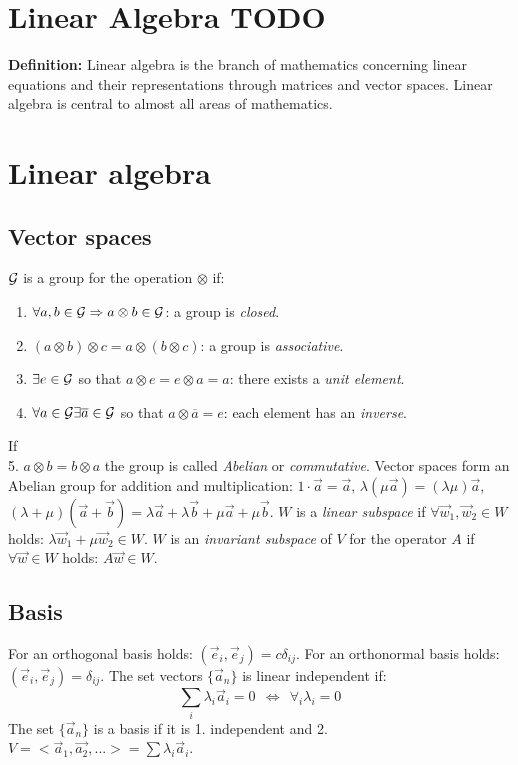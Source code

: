\chapter{Linear Algebra TODO}
\textbf{Definition:} Linear algebra is the branch of mathematics concerning linear equations and their representations through matrices and vector spaces. Linear algebra is central to almost all areas of mathematics.


\chapter{Linear algebra}
\section{Vector spaces}
$\cal G$ is a group for the operation $\otimes$ if:
\begin{enumerate}
	\item $\forall a,b\in{\cal G}\Rightarrow a\otimes b\in\cal G$: a group is
	{\it closed}.
	\item $(a\otimes b)\otimes c = a\otimes (b\otimes c)$: a group is
	{\it associative}.
	\item $\exists e\in{\cal G}$ so that $a\otimes e=e\otimes a=a$: there exists a
	{\it unit element}.
	\item $\forall a\in{\cal G}\exists \overline{a}\in{\cal G}$ so that $a\otimes\overline{a}=e$:
	each element has an {\it inverse}.
\end{enumerate}
If\\
\hspace*{4.5mm}5. $a\otimes b=b\otimes a$
\npar
the group is called {\it Abelian} or {\it commutative}.
Vector spaces form an Abelian group for addition and multiplication:
$1\cdot\vec{a}=\vec{a}$, $\lambda(\mu\vec{a})=(\lambda\mu)\vec{a}$,
$(\lambda+\mu)(\vec{a}+\vec{b})=\lambda\vec{a}+\lambda\vec{b}+\mu\vec{a}+\mu\vec{b}$.
\npar
$W$ is a {\it linear subspace} if $\forall \vec{w}_1,\vec{w}_2\in W$
holds: $\lambda\vec{w}_1+\mu\vec{w}_2\in W$.
\npar
$W$ is an {\it invariant subspace} of $V$ for the operator $A$ if
$\forall\vec{w}\in W$ holds: $A\vec{w}\in W$.

\section{Basis}
For an orthogonal basis holds: $(\vec{e}_i,\vec{e}_j)=c\delta_{ij}$. For an
orthonormal basis holds:  $(\vec{e}_i,\vec{e}_j)=\delta_{ij}$.
\npar
The set vectors $\{\vec{a}_n\}$ is linear independent if:
\[
\sum\limits_i\lambda_i\vec{a}_i=0~~\Leftrightarrow~~\forall_i\lambda_i=0
\]
The set $\{\vec{a}_n\}$ is a basis if it is 1. independent and 2.
$V=<\vec{a}_1,\vec{a_2},...>=\sum\lambda_i\vec{a}_i$.

